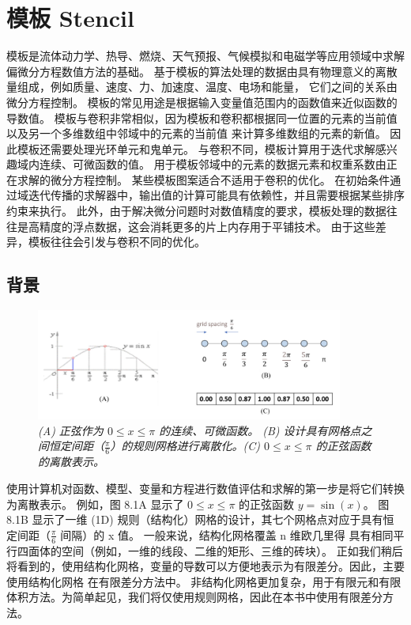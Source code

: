 \section{模板 Stencil}
模板是流体动力学、热导、燃烧、天气预报、气候模拟和电磁学等应用领域中求解偏微分方程数值方法的基础。 
基于模板的算法处理的数据由具有物理意义的离散量组成，例如质量、速度、力、加速度、温度、电场和能量，
它们之间的关系由微分方程控制。 模板的常见用途是根据输入变量值范围内的函数值来近似函数的导数值。 
模板与卷积非常相似，因为模板和卷积都根据同一位置的元素的当前值以及另一个多维数组中邻域中的元素的当前值
来计算多维数组的元素的新值。 因此模板还需要处理光环单元和鬼单元。 与卷积不同，模板计算用于迭代求解感兴趣域内连续、可微函数的值。 
用于模板邻域中的元素的数据元素和权重系数由正在求解的微分方程控制。 某些模板图案适合不适用于卷积的优化。 
在初始条件通过域迭代传播的求解器中，输出值的计算可能具有依赖性，并且需要根据某些排序约束来执行。 
此外，由于解决微分问题时对数值精度的要求，模板处理的数据往往是高精度的浮点数据，这会消耗更多的片上内存用于平铺技术。 
由于这些差异，模板往往会引发与卷积不同的优化。

\subsection{背景}
\begin{figure}[H]
	\centering
	\includegraphics[width=0.9\textwidth]{figs/F8.1.png}
	\caption{\textit{(A) 正弦作为 $0 \leq x \leq \pi$ 的连续、可微函数。 
	(B) 设计具有网格点之间恒定间距（$\frac{\pi}{6}$）的规则网格进行离散化。(C) $0 \leq x \leq\pi$ 的正弦函数的离散表示。}}
\end{figure}

使用计算机对函数、模型、变量和方程进行数值评估和求解的第一步是将它们转换为离散表示。 
例如，图 8.1A 显示了 $0 \leq x \leq \pi$ 的正弦函数 $y = \sin(x)$。 
图 8.1B 显示了一维 (1D) 规则（结构化）网格的设计，其七个网格点对应于具有恒定间距（$\frac{\pi}{6}$ 间隔）的 x 值。
一般来说，结构化网格覆盖 n 维欧几里得 具有相同平行四面体的空间（例如，一维的线段、二维的矩形、三维的砖块）。
正如我们稍后将看到的，使用结构化网格，变量的导数可以方便地表示为有限差分。因此，主要使用结构化网格 在有限差分方法中。
非结构化网格更加复杂，用于有限元和有限体积方法。为简单起见，我们将仅使用规则网格，因此在本书中使用有限差分方法。


